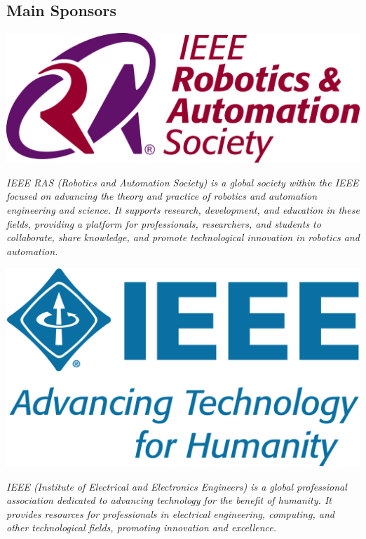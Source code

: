 \documentclass[
	openany, %
	parskip=full, %
	12pt, %
	a4paper, %
]{conferencebooklet} %
\begin{document}
\begin{multicols*}{2}
    \section{Main Sponsors}
    \hfill\includegraphics[width=\sponsorscaling\linewidth]{logos/ras.png}\hspace*{\fill}

    \textit{IEEE RAS (Robotics and Automation Society) is a global society within the IEEE focused on advancing the theory and practice of robotics and automation engineering and science. It supports research, development, and education in these fields, providing a platform for professionals, researchers, and students to collaborate, share knowledge, and promote technological innovation in robotics and automation.}

    \hfill\includegraphics[width=\sponsorscaling\linewidth]{logos/ieee.png}\hspace*{\fill}
    
    \textit{IEEE (Institute of Electrical and Electronics Engineers) is a global professional association dedicated to advancing technology for the benefit of humanity. It provides resources for professionals in electrical engineering, computing, and other technological fields, promoting innovation and excellence.} \\
        

\end{multicols*}
\end{document}
